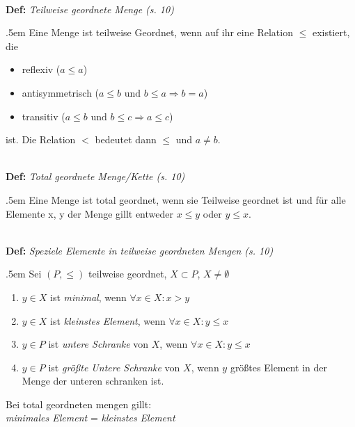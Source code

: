 \documentclass[twocolumn, 10pt]{article}
\newenvironment {definition}
                [1][]
                {\noindent\\{\bf
                Def:}\emph{
                #1}\indent\begin{addmargin}{.5em}}{\end{addmargin}}
\begin{document}
\begin{definition}[Teilweise geordnete Menge (s. 10)]
Eine Menge ist teilweise Geordnet, wenn auf ihr eine Relation $\leq$ existiert,
die \begin{itemize}
  \item reflexiv ($a\leq a$)
  \item antisymmetrisch ($a \leq b \text{ und } b\leq a \Rightarrow b = a$)
  \item transitiv ($a\leq b \text{ und } b\leq c \Rightarrow a\leq c$)
\end{itemize}
ist. Die Relation $<$ bedeutet dann $\leq$ und $a\neq b$.
\end{definition}

\begin{definition}[Total geordnete Menge/Kette (s. 10)]
Eine Menge ist total geordnet, wenn sie Teilweise geordnet ist und für alle
Elemente x, y der Menge gillt entweder $x \leq y$ oder $y \leq x$.
\end{definition}

\begin{definition}[Speziele Elemente in teilweise geordneten Mengen (s. 10)]
Sei $(P, \leq)$ teilweise geordnet, $X \subset P$, $X \neq \emptyset$
\begin{enumerate}
  \item $y \in X$ ist \emph{minimal}, wenn $\forall x \in X: x > y$
  \item $y \in X$ ist \emph{kleinstes Element}, wenn $\forall x \in X: y \leq x$ 
  \item $y \in P$ ist \emph{untere Schranke} von $X$, wenn $\forall x \in X: y
  \leq x$
  \item $y \in P$ ist \emph{größte Untere Schranke} von $X$, wenn $y$ größtes
  Element in der Menge der unteren schranken ist.
\end{enumerate}
Bei total geordneten mengen gillt:\\\indent \emph{minimales Element} =
\emph{kleinstes Element}
\end{definition}
\end{document}

